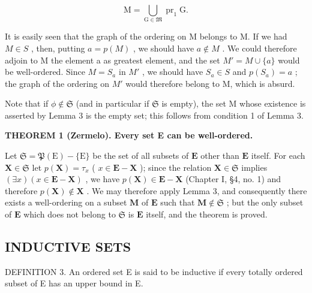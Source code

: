 \[
\mathrm{M} = \bigcup_ {\mathrm{G} \in \mathfrak {M}} \operatorname{pr} _ {1} \mathrm{G}.
\]

It is easily seen that the graph of the ordering on M belongs to M. If we had \(M \in S\) , then, putting \(a = p(M)\) , we should have \(a \notin M\) . We could therefore adjoin to M the element a as greatest element, and the set \(M' = M \cup \{a\}\) would be well-ordered. Since \(M = S_a\) in \(M'\) , we should have \(S_a \in S\) and \(p(S_a) = a\) ; the graph of the ordering on \(M'\) would therefore belong to M, which is absurd.

Note that if \(\phi \notin \mathfrak{S}\) (and in particular if \(\mathfrak{S}\) is empty), the set M whose existence is asserted by Lemma 3 is the empty set; this follows from condition 1 of Lemma 3.

\textbf{THEOREM 1 (Zermelo). Every set E can be well-ordered.}

Let \(\mathfrak{S} = \mathfrak{P}(\mathrm{E}) - \{\mathrm{E}\}\) be the set of all subsets of \(\mathbf{E}\) other than \(\mathbf{E}\) itself. For each \(\mathbf{X} \in \mathfrak{S}\) let \(p(\mathbf{X}) = \tau_x\) ( \(x \in \mathbf{E} - \mathbf{X}\) ); since the relation \(\mathbf{X} \in \mathfrak{S}\) implies \((\exists x)(x \in \mathbf{E} - \mathbf{X})\) , we have \(p(\mathbf{X}) \in \mathbf{E} - \mathbf{X}\) (Chapter I, §4, no. 1) and therefore \(p(\mathbf{X}) \notin \mathbf{X}\) . We may therefore apply Lemma 3, and consequently there exists a well-ordering on a subset \(\mathbf{M}\) of \(\mathbf{E}\) such that \(\mathbf{M} \notin \mathfrak{S}\) ; but the only subset of \(\mathbf{E}\) which does not belong to \(\mathfrak{S}\) is \(\mathbf{E}\) itself, and the theorem is proved.

\subsection{INDUCTIVE SETS}

DEFINITION 3. An ordered set E is said to be inductive if every totally ordered subset of E has an upper bound in E.



